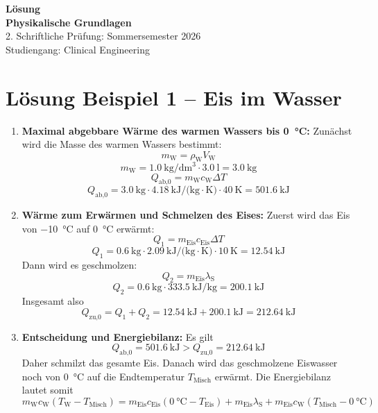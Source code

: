\documentclass[11pt, a4paper]{article}
\begin{document}
\noindent
\vspace{9cm}
\begin{center}
    {\Huge \textbf{Lösung}} \\[1.5em]
    {\Large \textbf{Physikalische Grundlagen}} \\[1em]
    {\large 2. Schriftliche Pr\"ufung: Sommersemester 2026} \\[1em]
    {\large Studiengang: Clinical Engineering}
\end{center}

\newpage

\section*{Lösung Beispiel 1 -- Eis im Wasser}
\begin{enumerate}
    \item \textbf{Maximal abgebbare Wärme des warmen Wassers bis \SI{0}{\degreeCelsius}:}
    Zunächst wird die Masse des warmen Wassers bestimmt:
    \[
        m_{\text{W}} = \rho_{\text{W}} V_{\text{W}}
    \]
    \[
        m_{\text{W}} = \SI{1.0}{\kilogram\per\deci\metre\cubed} \cdot \SI{3.0}{\litre} = \SI{3.0}{\kilogram}
    \]
    \[
        Q_{\text{ab,0}} = m_{\text{W}} c_{\text{W}} \Delta T
    \]
    \[
        Q_{\text{ab,0}} = \SI{3.0}{\kilogram} \cdot \SI{4.18}{\kilo\joule\per(\kilogram\cdot\kelvin)} \cdot \SI{40}{\kelvin} = \SI{501.6}{\kilo\joule}
    \]

    \item \textbf{Wärme zum Erwärmen und Schmelzen des Eises:}
    Zuerst wird das Eis von \SI{-10}{\degreeCelsius} auf \SI{0}{\degreeCelsius} erwärmt:
    \[
        Q_1 = m_{\text{Eis}} c_{\text{Eis}} \Delta T
    \]
    \[
        Q_1 = \SI{0.6}{\kilogram} \cdot \SI{2.09}{\kilo\joule\per(\kilogram\cdot\kelvin)} \cdot \SI{10}{\kelvin} = \SI{12.54}{\kilo\joule}
    \]
    Dann wird es geschmolzen:
    \[
        Q_2 = m_{\text{Eis}} \lambda_{\text{S}}
    \]
    \[
        Q_2 = \SI{0.6}{\kilogram} \cdot \SI{333.5}{\kilo\joule\per\kilogram} = \SI{200.1}{\kilo\joule}
    \]
    Insgesamt also
    \[
        Q_{\text{zu,0}} = Q_1 + Q_2 = \SI{12.54}{\kilo\joule} + \SI{200.1}{\kilo\joule} = \SI{212.64}{\kilo\joule}
    \]

    \item \textbf{Entscheidung und Energiebilanz:}
    Es gilt
    \[
        Q_{\text{ab,0}} = \SI{501.6}{\kilo\joule} > Q_{\text{zu,0}} = \SI{212.64}{\kilo\joule}
    \]
    Daher schmilzt das gesamte Eis. Danach wird das geschmolzene Eiswasser noch von \SI{0}{\degreeCelsius} auf die Endtemperatur $T_{\text{Misch}}$ erwärmt. Die Energiebilanz lautet somit
    \[
        m_{\text{W}} c_{\text{W}} (T_{\text{W}} - T_{\text{Misch}}) = m_{\text{Eis}} c_{\text{Eis}} (\SI{0}{\degreeCelsius} - T_{\text{Eis}}) + m_{\text{Eis}} \lambda_{\text{S}} + m_{\text{Eis}} c_{\text{W}} (T_{\text{Misch}} - \SI{0}{\degreeCelsius})
    \]


\end{enumerate}
\end{document}
